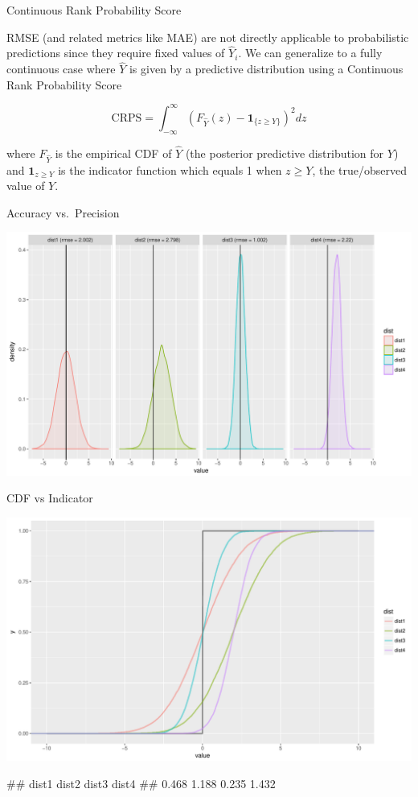 \documentclass[11pt,ignorenonframetext,]{beamer}
\let\oldverbatim\verbatim
\let\endoldverbatim\endverbatim
\renewenvironment{verbatim}{\footnotesize\begin{spacing}{0.9}\oldverbatim}{\endoldverbatim\end{spacing}}
\begin{document}
\begin{frame}{Continuous Rank Probability Score}

RMSE (and related metrics like MAE) are not directly applicable to
probabilistic predictions since they require fixed values of
\(\hat{Y}_i\). We can generalize to a fully continuous case where
\(\hat{Y}\) is given by a predictive distribution using a Continuous
Rank Probability Score

\[ \text{CRPS} = \int_{-\infty}^\infty \left(F_{\hat{Y}}(z) - \bm{1}_{\{z \geq Y\}}\right)^2 dz \]

where \(F_{\hat{Y}}\) is the empirical CDF of \(\hat{Y}\) (the posterior
predictive distribution for \(Y\)) and \(\bm{1}_{z \geq Y}\) is the
indicator function which equals 1 when \(z \geq Y\), the true/observed
value of \(Y\).

\end{frame}

\begin{frame}{Accuracy vs.~Precision}

\includegraphics{Lec2_files/figure-beamer/unnamed-chunk-10-1.pdf}

\end{frame}

\begin{frame}[fragile]{CDF vs Indicator}

\includegraphics{Lec2_files/figure-beamer/unnamed-chunk-11-1.pdf}

\begin{verbatim}
## dist1 dist2 dist3 dist4 
## 0.468 1.188 0.235 1.432
\end{verbatim}

\end{frame}
\end{document}
